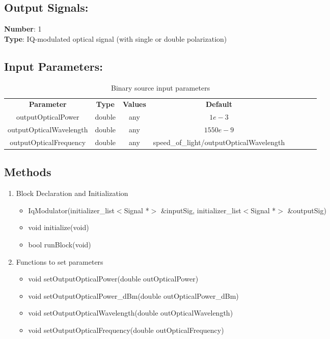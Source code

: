 \subsection*{Output Signals:}
\textbf{Number}: 1\\
\textbf{Type}: IQ-modulated optical signal (with single or double polarization)
\subsection*{Input Parameters:}
\begin{table}[h]
	\centering
	\begin{tabular}{|c|c|c|c|cccc}
		\cline{1-4}
		\textbf{Parameter} & \textbf{Type} & \textbf{Values} &   \textbf{Default}& \\ \cline{1-4}
		outputOpticalPower & double & any & $1e-3$ \\ \cline{1-4}
		outputOpticalWavelength & double & any & $1550e-9$ \\ \cline{1-4}
		outputOpticalFrequency & double & any & speed\_of\_light/outputOpticalWavelength \\ \cline{1-4}
	\end{tabular}
	\caption{Binary source input parameters}
	\label{table:iqmod_in_par}
\end{table}

\subsection*{Methods}
\begin{enumerate}
\item Block Declaration and Initialization
             \begin{itemize}
                 \item IqModulator(initializer\_list$<$Signal *$>$ \&inputSig, initializer\_list$<$Signal *$>$ \&outputSig)
                 \item void initialize(void)
	             \item bool runBlock(void)
             \end{itemize}
\item Functions to set parameters
             \begin{itemize}
                \item void setOutputOpticalPower(double outOpticalPower)
                \item void setOutputOpticalPower\_dBm(double outOpticalPower\_dBm)
                \item void setOutputOpticalWavelength(double outOpticalWavelength)
                \item void setOutputOpticalFrequency(double outOpticalFrequency)
             \end{itemize}
\end{enumerate}

